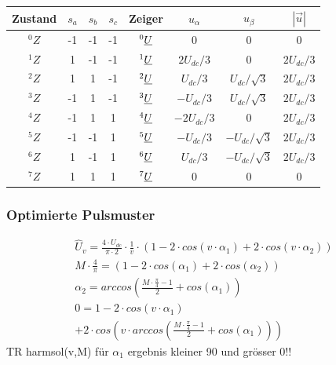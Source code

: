 \columnbreak
{\centering\footnotesize\setlength{\tabcolsep}{4pt}\renewcommand{\arraystretch}{1.1}
\begin{tabular}{|c|c|c|c|c|c|c|c|}
\hline
Zustand & $s_a$ & $s_b$ & $s_c$ & Zeiger & $u_\alpha$ & $u_\beta$ & $|\vec{u}|$ \\ \hline
$^0Z$ & -1 & -1 & -1 & $^0\underline{U}$ & 0 & 0 & 0 \\ \hline
$^1Z$ & 1 & -1 & -1 & $^1\underline{U}$ & $2U_{dc}/3$ & 0 & $2U_{dc}/3$ \\ \hline
$^2Z$ & 1 & 1 & -1 & $^2\underline{U}$ & $U_{dc}/3$ & $U_{dc}/\sqrt{3}$ & $2U_{dc}/3$ \\ \hline
$^3Z$ & -1 & 1 & -1 & $^3\underline{U}$ & $-U_{dc}/3$ & $U_{dc}/\sqrt{3}$ & $2U_{dc}/3$ \\ \hline
$^4Z$ & -1 & 1 & 1 & $^4\underline{U}$ & $-2U_{dc}/3$ & 0 & $2U_{dc}/3$ \\ \hline
$^5Z$ & -1 & -1 & 1 & $^5\underline{U}$ & $-U_{dc}/3$ & $-U_{dc}/\sqrt{3}$ & $2U_{dc}/3$ \\ \hline
$^6Z$ & 1 & -1 & 1 & $^6\underline{U}$ & $U_{dc}/3$ & $-U_{dc}/\sqrt{3}$ & $2U_{dc}/3$ \\ \hline
$^7Z$ & 1 & 1 & 1 & $^7\underline{U}$ & 0 & 0 & 0 \\ \hline
\end{tabular}\par}


\subsubsection{Optimierte Pulsmuster}
\begin{gather*}
\hat{U}_v = \frac{4 \cdot U_{dc}}{\pi \cdot 2} \cdot \frac{1}{v} \cdot (1 - 2 \cdot cos(v \cdot \alpha_1) + 2 \cdot cos(v \cdot \alpha_2)) \\
M \cdot \frac{4}{\pi} = (1 - 2 \cdot cos(\alpha_1) + 2 \cdot cos(\alpha_2)) %
\\
\alpha_2 = arccos\left(\frac{M \cdot \frac{\pi}{4} - 1}{2} + cos(\alpha_1)\right) \\
0 = 1 - 2 \cdot cos(v \cdot \alpha_1) \\
+ 2 \cdot cos\left(v \cdot arccos\left(\frac{M \cdot \frac{\pi}{4} - 1}{2} + cos(\alpha_1)\right)\right)
\end{gather*}
TR harmsol(v,M) für $\alpha_1$ ergebnis kleiner 90 und grösser 0!!

\columnbreak
{}
